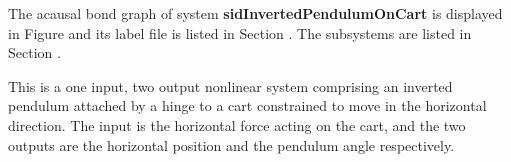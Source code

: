 

   The acausal bond graph of system \textbf{sidInvertedPendulumOnCart} is
   displayed in Figure  and its label
   file is listed in Section .
   The subsystems are listed in Section .

This is a one input, two output nonlinear system comprising an
inverted pendulum attached by a hinge to a cart constrained to move in
the horizontal direction. The input is the horizontal force acting on
the cart, and the two outputs are the horizontal position and the
pendulum angle respectively.

